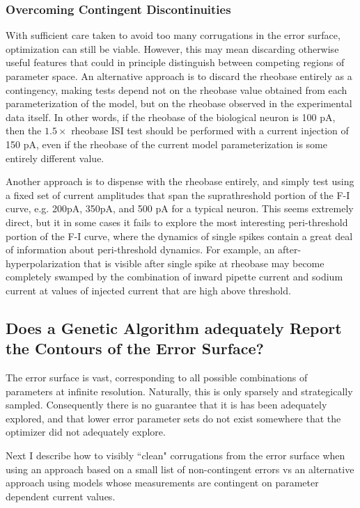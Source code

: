 
\subsubsection{Overcoming Contingent Discontinuities}
With sufficient care taken to avoid too many corrugations in the error surface,  optimization can still be viable.
However, this may mean discarding otherwise useful features that could in principle distinguish between competing regions of parameter space.
An alternative approach is to discard the rheobase entirely as a contingency,
making tests depend not on the rheobase value obtained from each parameterization of the model, but on the rheobase observed in the experimental data itself.
In other words, if the rheobase of the biological neuron is 100 pA, then the $1.5\times$ rheobase ISI test should be performed with a current injection of 150 pA, even if the rheobase of the current model parameterization is some entirely different value.

Another approach is to dispense with the rheobase entirely, and simply test using a fixed set of current amplitudes that span the suprathreshold portion of the F-I curve, e.g. 200pA, 350pA, and 500 pA for a typical neuron.
This seems extremely direct, but it in some cases it fails to explore the most interesting peri-threshold portion of the F-I curve, where the dynamics of single spikes contain a great deal of information about peri-threshold dynamics.
For example, an after-hyperpolarization that is visible after single spike at rheobase may become completely swamped by the combination of inward pipette current and sodium current at values of injected current that are high above threshold.

\subsection{Does a Genetic Algorithm adequately Report the Contours of the Error Surface?}
The error surface is vast, corresponding to all possible combinations of parameters at infinite resolution.
Naturally, this is only sparsely and strategically sampled.
Consequently there is no guarantee that it is has been adequately explored, and that lower error parameter sets do not exist somewhere that the optimizer did not adequately explore.

Next I describe how to visibly ``clean" corrugations from the error surface when using an approach based on a small list of non-contingent errors vs an alternative approach using models whose measurements are contingent on parameter dependent current values.

